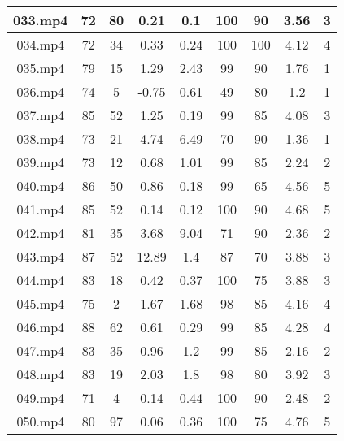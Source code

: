 \begin{enumerate}
\begin{longtable}{|c|c|c|c|c|c|c|c|c|}
		033.mp4 & 72      & 80      & 0.21    & 0.1       & 100         & 90          & 3.56 & 3     \\ \hline
		034.mp4 & 72      & 34      & 0.33    & 0.24      & 100         & 100         & 4.12 & 4     \\ \hline
		035.mp4 & 79      & 15      & 1.29    & 2.43      & 99          & 90          & 1.76 & 1     \\ \hline
		036.mp4 & 74      & 5       & -0.75   & 0.61      & 49          & 80          & 1.2  & 1     \\ \hline
		037.mp4 & 85      & 52      & 1.25    & 0.19      & 99          & 85          & 4.08 & 3     \\ \hline
		038.mp4 & 73      & 21      & 4.74    & 6.49      & 70          & 90          & 1.36 & 1     \\ \hline
		039.mp4 & 73      & 12      & 0.68    & 1.01      & 99          & 85          & 2.24 & 2     \\ \hline
		040.mp4 & 86      & 50      & 0.86    & 0.18      & 99          & 65          & 4.56 & 5     \\ \hline
		041.mp4 & 85      & 52      & 0.14    & 0.12      & 100         & 90          & 4.68 & 5     \\ \hline
		042.mp4 & 81      & 35      & 3.68    & 9.04      & 71          & 90          & 2.36 & 2     \\ \hline
		043.mp4 & 87      & 52      & 12.89   & 1.4       & 87          & 70          & 3.88 & 3     \\ \hline
		044.mp4 & 83      & 18      & 0.42    & 0.37      & 100         & 75          & 3.88 & 3     \\ \hline
		045.mp4 & 75      & 2       & 1.67    & 1.68      & 98          & 85          & 4.16 & 4     \\ \hline
		046.mp4 & 88      & 62      & 0.61    & 0.29      & 99          & 85          & 4.28 & 4     \\ \hline
		047.mp4 & 83      & 35      & 0.96    & 1.2       & 99          & 85          & 2.16 & 2     \\ \hline
		048.mp4 & 83      & 19      & 2.03    & 1.8       & 98          & 80          & 3.92 & 3     \\ \hline
		049.mp4 & 71      & 4       & 0.14    & 0.44      & 100         & 90          & 2.48 & 2     \\ \hline
		050.mp4 & 80      & 97      & 0.06    & 0.36      & 100         & 75          & 4.76 & 5     \\ \hline

\end{longtable}
\end{enumerate}
